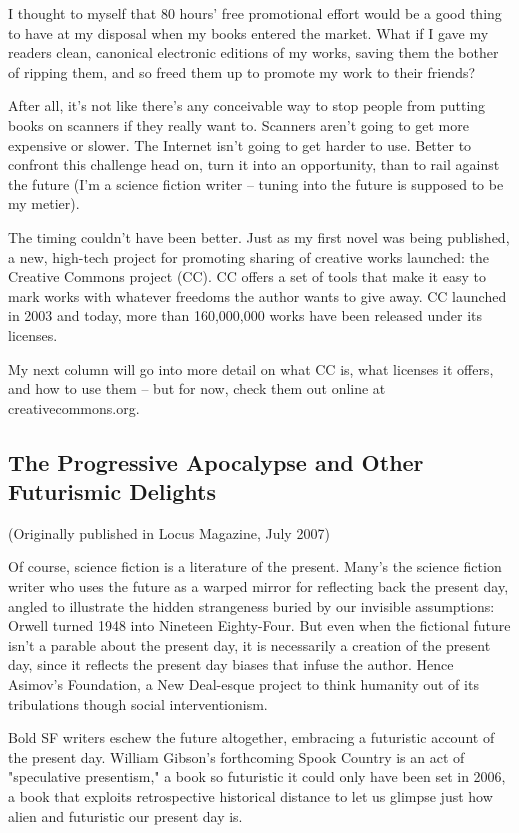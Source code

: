 I thought to myself that 80 hours' free promotional effort would be
a good thing to have at my disposal when my books entered the
market. What if I gave my readers clean, canonical electronic
editions of my works, saving them the bother of ripping them, and
so freed them up to promote my work to their friends?

After all, it's not like there's any conceivable way to stop people
from putting books on scanners if they really want to. Scanners
aren't going to get more expensive or slower. The Internet isn't
going to get harder to use. Better to confront this challenge head
on, turn it into an opportunity, than to rail against the future
(I'm a science fiction writer -- tuning into the future is supposed
to be my metier).

The timing couldn't have been better. Just as my first novel was
being published, a new, high-tech project for promoting sharing of
creative works launched: the Creative Commons project (CC). CC
offers a set of tools that make it easy to mark works with whatever
freedoms the author wants to give away. CC launched in 2003 and
today, more than 160,000,000 works have been released under its
licenses.

My next column will go into more detail on what CC is, what
licenses it offers, and how to use them -- but for now, check them
out online at creativecommons.org.

\subsection{The Progressive Apocalypse and Other Futurismic Delights}

(Originally published in Locus Magazine, July 2007)

Of course, science fiction is a literature of the present. Many's
the science fiction writer who uses the future as a warped mirror
for reflecting back the present day, angled to illustrate the
hidden strangeness buried by our invisible assumptions: Orwell
turned 1948 into Nineteen Eighty-Four. But even when the fictional
future isn't a parable about the present day, it is necessarily a
creation of the present day, since it reflects the present day
biases that infuse the author. Hence Asimov's Foundation, a New
Deal-esque project to think humanity out of its tribulations though
social interventionism.

Bold SF writers eschew the future altogether, embracing a
futuristic account of the present day. William Gibson's forthcoming
Spook Country is an act of "speculative presentism," a book so
futuristic it could only have been set in 2006, a book that
exploits retrospective historical distance to let us glimpse just
how alien and futuristic our present day is.

